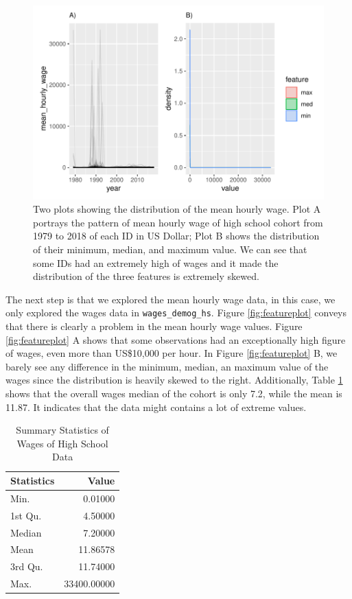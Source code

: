 \documentclass{article}
\begin{document}
\begin{figure}
\centering
\includegraphics{figures/featureplot-1.pdf}
\caption{Two plots showing the distribution of the mean hourly wage. Plot A portrays the pattern of mean hourly wage of high school cohort from 1979 to 2018 of each ID in US Dollar; Plot B shows the distribution of their minimum, median, and maximum value. We can see that some IDs had an extremely high of wages and it made the distribution of the three features is extremely skewed.}
\end{figure}

The next step is that we explored the mean hourly wage data, in this case, we only explored the wages data in \texttt{wages\_demog\_hs}. Figure \ref{fig:featureplot} conveys that there is clearly a problem in the mean hourly wage values. Figure \ref{fig:featureplot} A shows that some observations had an exceptionally high figure of wages, even more than US\$10,000 per hour. In Figure \ref{fig:featureplot} B, we barely see any difference in the minimum, median, an maximum value of the wages since the distribution is heavily skewed to the right. Additionally, Table \ref{tab:summarytable} shows that the overall wages median of the cohort is only 7.2, while the mean is 11.87. It indicates that the data might contains a lot of extreme values.

\begin{table}

\caption{\label{tab:summarytable}Summary Statistics of Wages of High School Data}
\centering
\begin{tabular}[t]{l|r}
\hline
Statistics & Value\\
\hline
\rowcolor{gray!6}  Min. & 0.01000\\
\hline
1st Qu. & 4.50000\\
\hline
\rowcolor{gray!6}  Median & 7.20000\\
\hline
Mean & 11.86578\\
\hline
\rowcolor{gray!6}  3rd Qu. & 11.74000\\
\hline
Max. & 33400.00000\\
\hline
\end{tabular}
\end{table}
\end{document}
